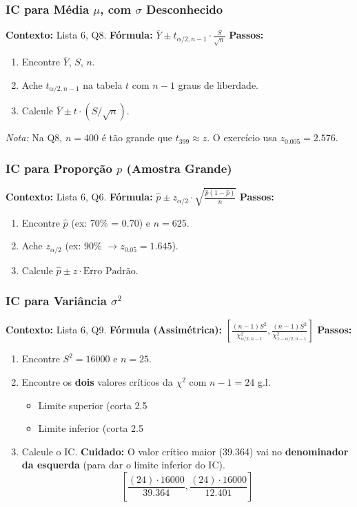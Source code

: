 \subsubsection{IC para Média $\mu$, com $\sigma$ Desconhecido}
\textbf{Contexto:} Lista 6, Q8.
\textbf{Fórmula:} $\overline{Y} \pm t_{\alpha/2, n-1} \cdot \frac{S}{\sqrt{n}}$
\textbf{Passos:}
\begin{enumerate}
    \item Encontre $\overline{Y}$, $S$, $n$.
    \item Ache $t_{\alpha/2, n-1}$ na tabela $t$ com $n-1$ graus de liberdade.
    \item Calcule $\overline{Y} \pm t \cdot (S/\sqrt{n})$.
\end{enumerate}
\textit{Nota:} Na Q8, $n=400$ é tão grande que $t_{399} \approx z$. O exercício usa $z_{0.005} = 2.576$.

\subsubsection{IC para Proporção $p$ (Amostra Grande)}
\textbf{Contexto:} Lista 6, Q6.
\textbf{Fórmula:} $\hat{p} \pm z_{\alpha/2} \cdot \sqrt{\frac{\hat{p}(1-\hat{p})}{n}}$
\textbf{Passos:}
\begin{enumerate}
    \item Encontre $\hat{p}$ (ex: 70\% = 0.70) e $n=625$.
    \item Ache $z_{\alpha/2}$ (ex: 90\% $\rightarrow z_{0.05} = 1.645$).
    \item Calcule $\hat{p} \pm z \cdot \text{Erro Padrão}$.
\end{enumerate}

\subsubsection{IC para Variância $\sigma^2$}
\textbf{Contexto:} Lista 6, Q9.
\textbf{Fórmula (Assimétrica):} $\left[ \frac{(n-1)S^2}{\chi^2_{\alpha/2, n-1}} , \frac{(n-1)S^2}{\chi^2_{1-\alpha/2, n-1}} \right]$
\textbf{Passos:}
\begin{enumerate}
    \item Encontre $S^2 = 16000$ e $n=25$.
    \item Encontre os \textbf{dois} valores críticos da $\chi^2$ com $n-1=24$ g.l.
    \begin{itemize}
        \item Limite superior (corta 2.5%
        \item Limite inferior (corta 2.5%
    \end{itemize}
    \item Calcule o IC. \textbf{Cuidado:} O valor crítico maior (39.364) vai no \textbf{denominador da esquerda} (para dar o limite inferior do IC).
    $$ \left[ \frac{(24) \cdot 16000}{39.364} , \frac{(24) \cdot 16000}{12.401} \right] $$
\end{enumerate}

